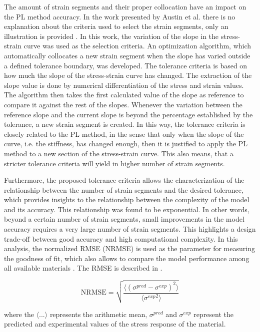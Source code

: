 The amount of strain segments and their proper collocation have an impact on the PL method accuracy. In the work presented by Austin et al. there is no explanation about the criteria used to select the strain segments, only an illustration is provided \cite{austin2015control}. In this work, the variation of the slope in the stress-strain curve was used as the selection criteria. An optimization algorithm, which automatically collocates a new strain segment when the slope has varied outside a defined tolerance boundary, was developed. The tolerance criteria is based on how much the slope of the stress-strain curve has changed. The extraction of the slope value is done by numerical differentiation of the stress and strain values. The algorithm then takes the first calculated value of the slope as reference to compare it against the rest of the slopes. Whenever the variation between the reference slope and the current slope is beyond the percentage established by the tolerance, a new strain segment is created. In this way, the tolerance criteria is closely related to the PL method, in the sense that only when the slope of the curve, i.e. the stiffness, has changed enough, then it is justified to apply the PL method to a new section of the stress-strain curve. This also means, that a stricter tolerance criteria will yield in higher number of strain segments.

Furthermore, the proposed tolerance criteria allows the characterization of the relationship between the number of strain segments and the desired tolerance, which provides insights to the relationship between the complexity of the model and its accuracy. This relationship was found to be exponential. In other words, beyond a certain number of strain segments, small improvements in the model accuracy requires a very large number of strain segments. This highlights a design trade-off between good accuracy and high computational complexity. In this analysis, the normalized RMSE (NRMSE) is used as the parameter for measuring the goodness of fit, which also allows to compare the model performance among all available materials \cite{bergstrom2015mechanics}. The RMSE is described in .

\begin{equation}
    \mathrm{NRMSE} = \sqrt{  \frac{\langle (\sigma^{pred} - \sigma^{exp})^2 \rangle}{\langle {\sigma^{exp}}^2 \rangle} }
\label{eq2}
\end{equation}

\noindent where the  $\langle ... \rangle$ represents the arithmetic mean, $\sigma^{pred}$ and $\sigma^{exp}$ represent the predicted and experimental values of the stress response of the material. 

